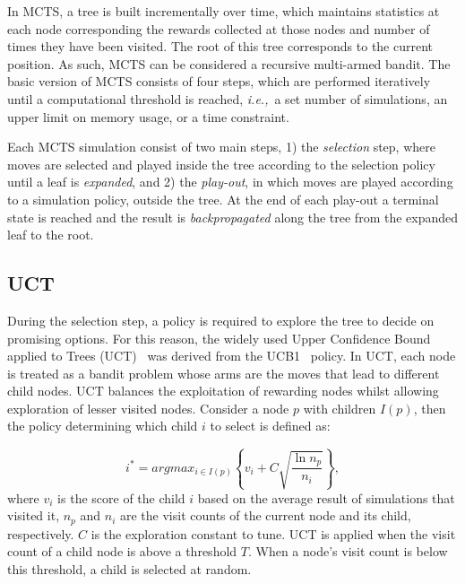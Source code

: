 \documentclass[a4paper]{llncs}
\newcommand{\ie}{{\it i.e.,}~}
\begin{document}
In MCTS, a tree is built incrementally over time, which maintains statistics at each node corresponding the rewards collected at those nodes and number of times they have been visited. The root of this tree corresponds to the current position. As such, MCTS can be considered a recursive multi-armed bandit. The basic version of MCTS consists of four steps, which are performed iteratively until a computational threshold is reached, \ie a set number of simulations, an upper limit on memory usage, or a time constraint. 

Each MCTS simulation consist of two main steps, 1) the \emph{selection} step, where moves are selected and played inside the tree according to the selection policy until a leaf is \emph{expanded}, and 2) the \emph{play-out}, in which moves are played according to a simulation policy, outside the tree. At the end of each play-out a terminal state is reached and the result is \emph{backpropagated} along the tree from the expanded leaf to the root.

\subsection{UCT}
\label{subsec:uct}
During the selection step, a policy is required to explore the tree to decide on promising options. For this reason, the widely used Upper Confidence Bound applied to Trees (UCT)~\cite{kocsis2006bandit} was derived from the UCB1~\cite{auer2002using} policy. In UCT, each node is treated as a bandit problem whose arms are the moves that lead to different child nodes. UCT balances the exploitation of rewarding nodes whilst allowing exploration of lesser visited nodes. Consider a node $p$ with children $I(p)$, then the policy determining which child $i$ to select is defined as:

\begin{equation}
\label{eq:uct}
i^* = argmax_{i \in I(p)}\left\{ v_i + C \sqrt{ \frac{\ln{n_p}}{n_i}}\right\},
\end{equation}
where $v_i$ is the score of the child $i$ based on the average result of simulations that visited it, $n_p$ and $n_i$ are the visit counts of the current node and its child, respectively. $C$ is the exploration constant to tune. UCT is applied when the visit count of a child node is above a threshold $T$. When a node's visit count is below this threshold, a child is selected at random.
\end{document}
